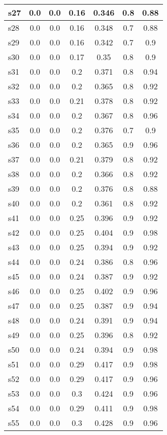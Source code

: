 \documentclass{article}
\begin{document}
\begin{tabular}{|l|c|c|c|c|c|c|}
\hline
s27 &0.0 & 0.0 & 0.16 & 0.346 & 0.8 & 0.88\\
\hline
s28 &0.0 & 0.0 & 0.16 & 0.348 & 0.7 & 0.88\\
\hline
s29 &0.0 & 0.0 & 0.16 & 0.342 & 0.7 & 0.9\\
\hline
s30 &0.0 & 0.0 & 0.17 & 0.35 & 0.8 & 0.9\\
\hline
s31 &0.0 & 0.0 & 0.2 & 0.371 & 0.8 & 0.94\\
\hline
s32 &0.0 & 0.0 & 0.2 & 0.365 & 0.8 & 0.92\\
\hline
s33 &0.0 & 0.0 & 0.21 & 0.378 & 0.8 & 0.92\\
\hline
s34 &0.0 & 0.0 & 0.2 & 0.367 & 0.8 & 0.96\\
\hline
s35 &0.0 & 0.0 & 0.2 & 0.376 & 0.7 & 0.9\\
\hline
s36 &0.0 & 0.0 & 0.2 & 0.365 & 0.9 & 0.96\\
\hline
s37 &0.0 & 0.0 & 0.21 & 0.379 & 0.8 & 0.92\\
\hline
s38 &0.0 & 0.0 & 0.2 & 0.366 & 0.8 & 0.92\\
\hline
s39 &0.0 & 0.0 & 0.2 & 0.376 & 0.8 & 0.88\\
\hline
s40 &0.0 & 0.0 & 0.2 & 0.361 & 0.8 & 0.92\\
\hline
s41 &0.0 & 0.0 & 0.25 & 0.396 & 0.9 & 0.92\\
\hline
s42 &0.0 & 0.0 & 0.25 & 0.404 & 0.9 & 0.98\\
\hline
s43 &0.0 & 0.0 & 0.25 & 0.394 & 0.9 & 0.92\\
\hline
s44 &0.0 & 0.0 & 0.24 & 0.386 & 0.8 & 0.96\\
\hline
s45 &0.0 & 0.0 & 0.24 & 0.387 & 0.9 & 0.92\\
\hline
s46 &0.0 & 0.0 & 0.25 & 0.402 & 0.9 & 0.96\\
\hline
s47 &0.0 & 0.0 & 0.25 & 0.387 & 0.9 & 0.94\\
\hline
s48 &0.0 & 0.0 & 0.24 & 0.391 & 0.9 & 0.94\\
\hline
s49 &0.0 & 0.0 & 0.25 & 0.396 & 0.8 & 0.92\\
\hline
s50 &0.0 & 0.0 & 0.24 & 0.394 & 0.9 & 0.98\\
\hline
s51 &0.0 & 0.0 & 0.29 & 0.417 & 0.9 & 0.98\\
\hline
s52 &0.0 & 0.0 & 0.29 & 0.417 & 0.9 & 0.96\\
\hline
s53 &0.0 & 0.0 & 0.3 & 0.424 & 0.9 & 0.96\\
\hline
s54 &0.0 & 0.0 & 0.29 & 0.411 & 0.9 & 0.98\\
\hline
s55 &0.0 & 0.0 & 0.3 & 0.428 & 0.9 & 0.96\\

\end{tabular}
\end{document}
